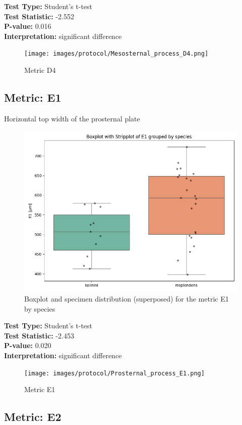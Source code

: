 \noindent\textbf{Test Type:} Student's t-test \\
\noindent\textbf{Test Statistic:} -2.552 \\
\noindent\textbf{P-value:} 0.016 \\
\noindent\textbf{Interpretation:} significant difference

\begin{figure}[H]
\centering
\texttt{[image: images/protocol/Mesosternal\_process\_D4.png]}
\caption{ Metric D4}
\end{figure}

\newpage
\subsection*{Metric: E1}

Horizontal top width of the prosternal plate 

\begin{figure}[H]
\centering
\includegraphics[width=0.7\linewidth]{images/boxplot/boxplot_E1.png}
\caption{  Boxplot and specimen distribution (superposed) for the metric  E1 by species}
\end{figure}

\noindent\textbf{Test Type:} Student's t-test \\
\noindent\textbf{Test Statistic:} -2.453 \\
\noindent\textbf{P-value:} 0.020 \\
\noindent\textbf{Interpretation:} significant difference

\begin{figure}[H]
\centering
\texttt{[image: images/protocol/Prosternal\_process\_E1.png]}
\caption{ Metric E1}
\end{figure}

\newpage
\subsection*{Metric: E2}

